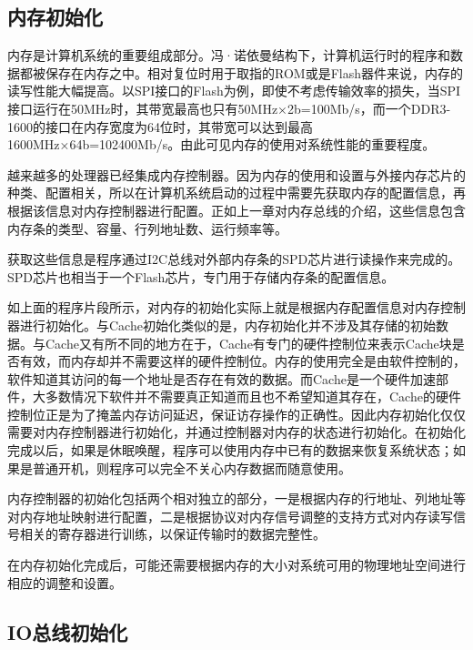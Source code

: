 \documentclass[]{ctexbook}
\begin{document}
\hypertarget{ux5185ux5b58ux521dux59cbux5316}{%
\subsection{内存初始化}\label{ux5185ux5b58ux521dux59cbux5316}}

内存是计算机系统的重要组成部分。冯·诺依曼结构下，计算机运行时的程序和数据都被保存在内存之中。相对复位时用于取指的ROM或是Flash器件来说，内存的读写性能大幅提高。以SPI接口的Flash为例，即使不考虑传输效率的损失，当SPI接口运行在50MHz时，其带宽最高也只有50MHz×2b=100Mb/s，而一个DDR3-1600的接口在内存宽度为64位时，其带宽可以达到最高1600MHz×64b=102400Mb/s。由此可见内存的使用对系统性能的重要程度。

越来越多的处理器已经集成内存控制器。因为内存的使用和设置与外接内存芯片的种类、配置相关，所以在计算机系统启动的过程中需要先获取内存的配置信息，再根据该信息对内存控制器进行配置。正如上一章对内存总线的介绍，这些信息包含内存条的类型、容量、行列地址数、运行频率等。

获取这些信息是程序通过I2C总线对外部内存条的SPD芯片进行读操作来完成的。SPD芯片也相当于一个Flash芯片，专门用于存储内存条的配置信息。

如上面的程序片段所示，对内存的初始化实际上就是根据内存配置信息对内存控制器进行初始化。与Cache初始化类似的是，内存初始化并不涉及其存储的初始数据。与Cache又有所不同的地方在于，Cache有专门的硬件控制位来表示Cache块是否有效，而内存却并不需要这样的硬件控制位。内存的使用完全是由软件控制的，软件知道其访问的每一个地址是否存在有效的数据。而Cache是一个硬件加速部件，大多数情况下软件并不需要真正知道而且也不希望知道其存在，Cache的硬件控制位正是为了掩盖内存访问延迟，保证访存操作的正确性。因此内存初始化仅仅需要对内存控制器进行初始化，并通过控制器对内存的状态进行初始化。在初始化完成以后，如果是休眠唤醒，程序可以使用内存中已有的数据来恢复系统状态；如果是普通开机，则程序可以完全不关心内存数据而随意使用。

内存控制器的初始化包括两个相对独立的部分，一是根据内存的行地址、列地址等对内存地址映射进行配置，二是根据协议对内存信号调整的支持方式对内存读写信号相关的寄存器进行训练，以保证传输时的数据完整性。

在内存初始化完成后，可能还需要根据内存的大小对系统可用的物理地址空间进行相应的调整和设置。

\hypertarget{ioux603bux7ebfux521dux59cbux5316}{%
\subsection{IO总线初始化}\label{ioux603bux7ebfux521dux59cbux5316}}
\end{document}
